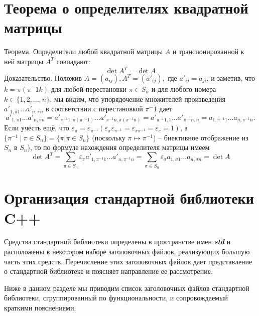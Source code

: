 \documentclass[a4paper, 12pt]{article} %
\begin{document}
\section*{Теорема о определителях квадратной матрицы}
Теорема. Определители любой квадратной матрицы $A$ и транспонированной к ней матрицы $A^T$ совпадают:
\begin{equation}
    \det A^T = \det A
\end{equation}
Доказательство. Положив $A = (a_{ij}), A^T = (a'_{ij}),$ где $a'_{ij} = a_{ji}$, и заметив, что $k = \pi(\pi^-1 k)$ для любой перестановки $\pi \in S_n$ и для любого номера $k \in \{1,2,...,n\}$, мы видим, что упорядочение множителей произведения $a'_{1,\pi 1} ... a'_{n,\pi n}$ в соответствии с перестановкой $\pi^-1$ дает
\begin{equation}
    a'_{1,\pi 1} ... a'_{n,\pi n} = a'_{\pi^{-1} 1, \pi(\pi^{-1} 1)} ... a'_{\pi^{-1} n, \pi(\pi^{-1} n)} = a'_{\pi^{-1} 1, 1} ... a'_{\pi^{-1} n, n} = a_{1, \pi^{-1} 1} ... a_{n, \pi^{-1} n}.
\end{equation}
Если учесть ещё, что $\varepsilon_\pi = \varepsilon_{\pi^{-1}} (\varepsilon_\pi \varepsilon_{\pi^{-1}} = \varepsilon_{\pi \pi^{-1}} = \varepsilon_e = 1)$, а $\{\pi^{-1} \ | \ \pi \in S_n\} = \{\pi | \pi \in S_n\}$ (поскольку $\pi \mapsto \pi^{-1}$) -- биективное отображение из $S_n$ в $S_n$), то по формуле нахождения определителя матрицы имеем
\begin{equation}
    \det A^T = \sum_{\pi \in S_n} \varepsilon_\pi a'_{1, \pi^{-1} 1} ... a'_{n, \pi^{-1} n} = \sum_{\sigma \in S_n} \varepsilon_\sigma a_{1, \sigma 1} ... a_{n, \sigma n} = \det A
\end{equation}

\clearpage
\section*{Организация стандартной библиотеки C++}
Средства стандартной библиотеки определены в пространстве имен \textbf{\textit{std}} и расположены в некотором наборе заголовочных файлов, реализующих большую часть этих средств. Перечисление этих заголовочных файлов дает представление о стандартной библиотеке и поясняет направление ее рассмотрение.

Ниже в данном разделе мы приводим список заголовочных файлов стандартной библиотеки, сгруппированный по функциональности, и сопровождаемый краткими пояснениями.
\end{document}
